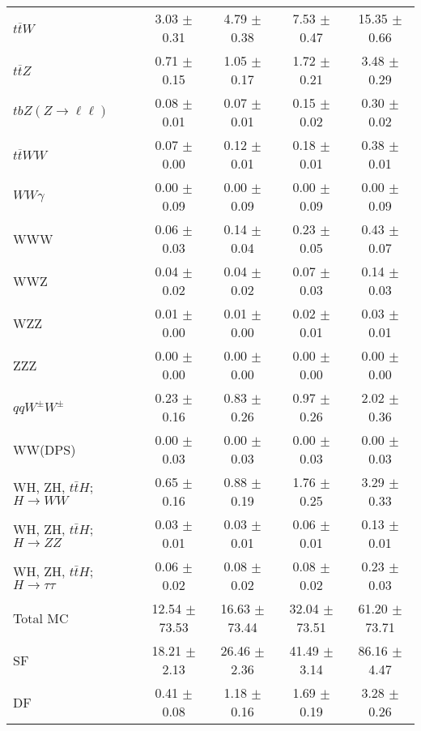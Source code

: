 \begin{tabular}{l|cccc}
                   $t\overline{t}W$ &  3.03 $\pm$  0.31 &  4.79 $\pm$  0.38 &  7.53 $\pm$  0.47 & 15.35 $\pm$  0.66 \\
                   $t\overline{t}Z$ &  0.71 $\pm$  0.15 &  1.05 $\pm$  0.17 &  1.72 $\pm$  0.21 &  3.48 $\pm$  0.29 \\
    $tbZ (Z \rightarrow \ell \ell)$ &  0.08 $\pm$  0.01 &  0.07 $\pm$  0.01 &  0.15 $\pm$  0.02 &  0.30 $\pm$  0.02 \\
                  $t\overline{t}WW$ &  0.07 $\pm$  0.00 &  0.12 $\pm$  0.01 &  0.18 $\pm$  0.01 &  0.38 $\pm$  0.01 \\
                         $WW\gamma$ &  0.00 $\pm$  0.09 &  0.00 $\pm$  0.09 &  0.00 $\pm$  0.09 &  0.00 $\pm$  0.09 \\
                                WWW &  0.06 $\pm$  0.03 &  0.14 $\pm$  0.04 &  0.23 $\pm$  0.05 &  0.43 $\pm$  0.07 \\
                                WWZ &  0.04 $\pm$  0.02 &  0.04 $\pm$  0.02 &  0.07 $\pm$  0.03 &  0.14 $\pm$  0.03 \\
                                WZZ &  0.01 $\pm$  0.00 &  0.01 $\pm$  0.00 &  0.02 $\pm$  0.01 &  0.03 $\pm$  0.01 \\
                                ZZZ &  0.00 $\pm$  0.00 &  0.00 $\pm$  0.00 &  0.00 $\pm$  0.00 &  0.00 $\pm$  0.00 \\
                 $qqW^{\pm}W^{\pm}$ &  0.23 $\pm$  0.16 &  0.83 $\pm$  0.26 &  0.97 $\pm$  0.26 &  2.02 $\pm$  0.36 \\
                            WW(DPS) &  0.00 $\pm$  0.03 &  0.00 $\pm$  0.03 &  0.00 $\pm$  0.03 &  0.00 $\pm$  0.03 \\
WH, ZH, $t\bar{t}H$; $H \rightarrow WW$ &  0.65 $\pm$  0.16 &  0.88 $\pm$  0.19 &  1.76 $\pm$  0.25 &  3.29 $\pm$  0.33 \\
WH, ZH, $t\bar{t}H$; $H \rightarrow ZZ$ &  0.03 $\pm$  0.01 &  0.03 $\pm$  0.01 &  0.06 $\pm$  0.01 &  0.13 $\pm$  0.01 \\
WH, ZH, $t\bar{t}H$; $H \rightarrow \tau\tau$ &  0.06 $\pm$  0.02 &  0.08 $\pm$  0.02 &  0.08 $\pm$  0.02 &  0.23 $\pm$  0.03 \\
\hline\hline
                           Total MC & 12.54 $\pm$ 73.53 & 16.63 $\pm$ 73.44 & 32.04 $\pm$ 73.51 & 61.20 $\pm$ 73.71 \\
\hline
                                 SF & 18.21 $\pm$  2.13 & 26.46 $\pm$  2.36 & 41.49 $\pm$  3.14 & 86.16 $\pm$  4.47 \\
                                 DF &  0.41 $\pm$  0.08 &  1.18 $\pm$  0.16 &  1.69 $\pm$  0.19 &  3.28 $\pm$  0.26 \\

\end{tabular}
